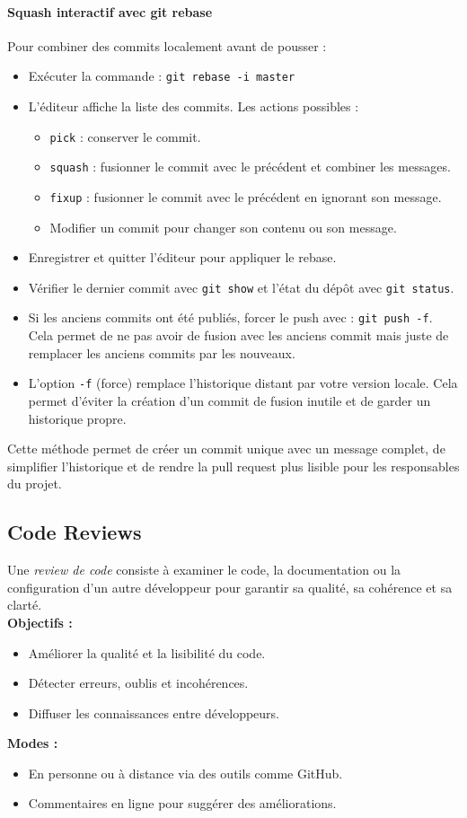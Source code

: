\documentclass{article}
\begin{document}
\paragraph{Squash interactif avec git rebase}

Pour combiner des commits localement avant de pousser :
\begin{itemize}
    \item Exécuter la commande : \texttt{git rebase -i master}
    \item L’éditeur affiche la liste des commits. Les actions possibles :
    \begin{itemize}
        \item \texttt{pick} : conserver le commit.
        \item \texttt{squash} : fusionner le commit avec le précédent et combiner les messages.
        \item \texttt{fixup} : fusionner le commit avec le précédent en ignorant son message.
        \item Modifier un commit pour changer son contenu ou son message.
    \end{itemize}
    \item Enregistrer et quitter l’éditeur pour appliquer le rebase.
    \item Vérifier le dernier commit avec \texttt{git show} et l’état du dépôt avec \texttt{git status}.
    \item Si les anciens commits ont été publiés, forcer le push avec : \texttt{git push -f}. Cela permet de ne pas avoir de fusion avec les anciens commit mais juste de remplacer les anciens commits par les nouveaux.
    \item L’option \texttt{-f} (force) remplace l’historique distant par votre version locale.  
    Cela permet d’éviter la création d’un commit de fusion inutile et de garder un historique propre.
\end{itemize}
Cette méthode permet de créer un commit unique avec un message complet, de simplifier l’historique et de rendre la pull request plus lisible pour les responsables du projet.

\subsection{Code Reviews}
Une \textit{review de code} consiste à examiner le code, la documentation ou la configuration d’un autre développeur pour garantir sa qualité, sa cohérence et sa clarté.
\\
\textbf{Objectifs :}
\begin{itemize}
    \item Améliorer la qualité et la lisibilité du code.
    \item Détecter erreurs, oublis et incohérences.
    \item Diffuser les connaissances entre développeurs.
\end{itemize}
\textbf{Modes :}
\begin{itemize}
    \item En personne ou à distance via des outils comme GitHub.
    \item Commentaires en ligne pour suggérer des améliorations.
\end{itemize}
\end{document}
